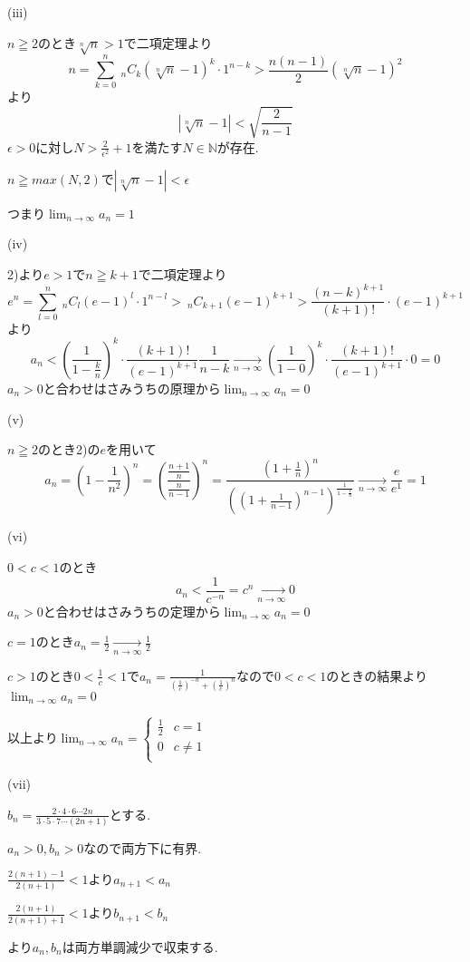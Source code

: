 \documentclass{jsarticle}
\begin{document}
(iii)

$n\geqq2$のとき$\sqrt[n]{n}>1$で二項定理より
\[n=\sum_{k=0}^n \ _nC_k (\sqrt[n]{n}-1)^k\cdot 1^{n-k}
>\frac{n(n-1)}{2}(\sqrt[n]{n}-1)^2\]
より
\[|\sqrt[n]{n}-1| < \sqrt{\frac{2}{n-1}}\]
$\epsilon >0$に対し$N>\frac{2}{\epsilon^2}+1$を満たす$N\in\mathbb{N}$が存在.

$n\geqq max(N,2)$で$|\sqrt[n]{n}-1| < \epsilon$

つまり$\displaystyle\lim_{n\to\infty}a_n=1$

(iv)

2)より$e>1$で$n\geqq k+1$で二項定理より
\[e^n = \sum_{l=0}^n \ _nC_l(e-1)^l\cdot 1^{n-l}> \ _nC_{k+1}(e-1)^{k+1} > \frac{(n-k)^{k+1}}{(k+1)!}\cdot (e-1)^{k+1}\]
より
\[a_n <(\frac{1}{1-\frac{k}{n}})^k\cdot \frac{(k+1)!}{(e-1)^{k+1}}\frac{1}{n-k}\xrightarrow[n\to\infty]{}(\frac{1}{1-0})^k\cdot \frac{(k+1)!}{(e-1)^{k+1}}\cdot 0 = 0\]
$a_n>0$と合わせはさみうちの原理から$\displaystyle\lim_{n\to\infty}a_n=0$

(v)

$n\geqq 2$のとき2)の$e$を用いて
\[a_n=(1-\frac{1}{n^2})^n=(\frac{\frac{n+1}{n}}{\frac{n}{n-1}})^n=\frac{(1+\frac{1}{n})^n}{((1+\frac{1}{n-1})^{n-1})^\frac{1}{1-\frac{1}{n}}}\xrightarrow[n\to\infty]{}\frac{e}{e^{1}}=1\]

(vi)

$0<c<1$のとき
\[a_n < \frac{1}{c^{-n}}=c^n\xrightarrow[n\to\infty]{}0\]
$a_n>0$と合わせはさみうちの定理から$\displaystyle \lim_{n\to \infty}a_n=0$

$c=1$のとき$a_n=\frac{1}{2}\xrightarrow[n\to\infty]{}\frac{1}{2}$

$c>1$のとき$0<\frac{1}{c}<1$で$a_n=\frac{1}{(\frac{1}{c})^{-n}+(\frac{1}{c})^{n}}$なので$0<c<1$のときの結果より$\displaystyle \lim_{n\to \infty}a_n=0$

以上より$\displaystyle \lim_{n\to \infty}a_n=\begin{cases}
\frac{1}{2} & c=1\\
0 & c\neq 1\\
\end{cases}$

(vii)

$b_n=\frac{2\cdot4\cdot 6\cdots 2n}{3\cdot5\cdot 7\cdots (2n+1)}$とする.

$a_n>0,b_n>0$なので両方下に有界.

$\frac{2(n+1)-1}{2(n+1)}<1$より$a_{n+1}<a_n$

$\frac{2(n+1)}{2(n+1)+1}<1$より$b_{n+1}<b_n$

より$a_n,b_n$は両方単調減少で収束する.
\end{document}
